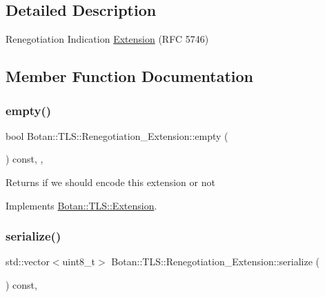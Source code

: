\subsection{Detailed Description}
Renegotiation Indication \hyperlink{class_botan_1_1_t_l_s_1_1_extension}{Extension} (R\+FC 5746) 

\subsection{Member Function Documentation}
\mbox{\label{class_botan_1_1_t_l_s_1_1_renegotiation___extension_a3e8751e4089301b3d9b39e7e2028573e}} 
\subsubsection{\texorpdfstring{empty()}{empty()}}
{\footnotesize\ttfamily bool Botan\+::\+T\+L\+S\+::\+Renegotiation\+\_\+\+Extension\+::empty (\begin{DoxyParamCaption}{ }\end{DoxyParamCaption}) const\hspace{0.3cm}{\ttfamily [inline]}, {\ttfamily [override]}, {\ttfamily [virtual]}}

\begin{DoxyReturn}{Returns}
if we should encode this extension or not 
\end{DoxyReturn}


Implements \hyperlink{class_botan_1_1_t_l_s_1_1_extension_aa850b9be2322f94e7c65e583cd51acc5}{Botan\+::\+T\+L\+S\+::\+Extension}.

\mbox{\label{class_botan_1_1_t_l_s_1_1_renegotiation___extension_a711f6f2ba21e408a00d81fe1bc98751b}} 
\subsubsection{\texorpdfstring{serialize()}{serialize()}}
{\footnotesize\ttfamily std\+::vector$<$uint8\+\_\+t$>$ Botan\+::\+T\+L\+S\+::\+Renegotiation\+\_\+\+Extension\+::serialize (\begin{DoxyParamCaption}{ }\end{DoxyParamCaption}) const\hspace{0.3cm}{\ttfamily [override]}, {\ttfamily [virtual]}}

